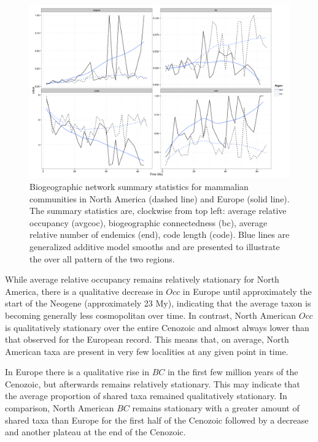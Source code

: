 \documentclass[12pt,letterpaper]{article}
\begin{document}
\begin{figure}[ht]
  \begin{center}
    \includegraphics[height = 0.4\textheight, keepaspectratio = true]{figure/gen_bin}
  \end{center}
  \caption{Biogeographic network summary statistics for mammalian communities in North America (dashed line) and Europe (solid line). The summary statistics are, clockwise from top left: average relative occupancy (avgcoc), biogeographic connectedness (bc), average relative number of endemics (end), code length (code). Blue lines are generalized additive model smooths and are presented to illustrate the over all pattern of the two regions.} 
  \label{fig:mam_tot}
\end{figure}

While average relative occupancy remains relatively stationary for North America, there is a qualitative decrease in \(Occ\) in Europe until approximately the start of the Neogene (approximately 23 My), indicating that the average taxon is becoming generally less cosmopolitan over time. In contrast, North American \(Occ\) is qualitatively stationary over the entire Cenozoic and almost always lower than that observed for the European record. This means that, on average, North American taxa are present in very few localities at any given point in time.

In Europe there is a qualitative rise in \(BC\) in the first few million years of the Cenozoic, but afterwards remains relatively stationary. This may indicate that the average proportion of shared taxa remained qualitatively stationary. In comparison, North American \(BC\) remains stationary with a greater amount of shared taxa than Europe for the first half of the Cenozoic followed by a decrease and another plateau at the end of the Cenozoic.
\end{document}
